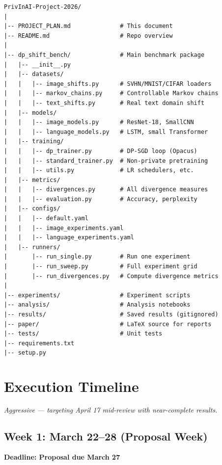 \documentclass[11pt,a4paper]{article}
\begin{document}
\begin{lstlisting}
PrivInAI-Project-2026/
|
|-- PROJECT_PLAN.md              # This document
|-- README.md                    # Repo overview
|
|-- dp_shift_bench/              # Main benchmark package
|   |-- __init__.py
|   |-- datasets/
|   |   |-- image_shifts.py      # SVHN/MNIST/CIFAR loaders
|   |   |-- markov_chains.py     # Controllable Markov chains
|   |   |-- text_shifts.py       # Real text domain shift
|   |-- models/
|   |   |-- image_models.py      # ResNet-18, SmallCNN
|   |   |-- language_models.py   # LSTM, small Transformer
|   |-- training/
|   |   |-- dp_trainer.py        # DP-SGD loop (Opacus)
|   |   |-- standard_trainer.py  # Non-private pretraining
|   |   |-- utils.py             # LR schedulers, etc.
|   |-- metrics/
|   |   |-- divergences.py       # All divergence measures
|   |   |-- evaluation.py        # Accuracy, perplexity
|   |-- configs/
|   |   |-- default.yaml
|   |   |-- image_experiments.yaml
|   |   |-- language_experiments.yaml
|   |-- runners/
|       |-- run_single.py        # Run one experiment
|       |-- run_sweep.py         # Full experiment grid
|       |-- run_divergences.py   # Compute divergence metrics
|
|-- experiments/                 # Experiment scripts
|-- analysis/                    # Analysis notebooks
|-- results/                     # Saved results (gitignored)
|-- paper/                       # LaTeX source for reports
|-- tests/                       # Unit tests
|-- requirements.txt
|-- setup.py
\end{lstlisting}

\section{Execution Timeline}

\textit{Aggressive --- targeting April 17 mid-review with near-complete results.}

\subsection{Week 1: March 22--28 (Proposal Week)}

\textbf{Deadline: Proposal due March 27}
\end{document}
